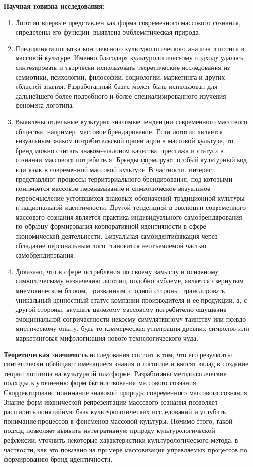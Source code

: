 \textbf{Научная новизна исследования:}
\begin{enumerate}
\item Логотип впервые представлен как форма современного массового сознания, определены его функции, выявлена эмблематическая природа.
\item Предпринята попытка комплексного культурологического анализа логотипа в массовой культуре. Именно благодаря культурологическому подходу удалось синтезировать и творчески использовать теоретические исследования из семиотики, психологии, философии, социологии, маркетинга и других областей знания. Разработанный базис может быть использован для дальнейшего более подробного и более специализированного изучения феномена логотипа.
\item Выявлены отдельные культурно значимые тенденции современного массового общества, например, массовое брендирование. Если логотип является визуальным знаком потребительской ориентации в массовой культуре, то бренд можно считать знаком-эталоном качества, престижа и статуса в сознании массового потребителя. Бренды формируют особый культурный код или язык в современной массовой культуре. В частности, интерес представляют процессы территориального брендирования, под которыми понимается массовое переназывание и символическое визуальное переосмысление устоявшихся знаковых обозначений традиционной культуры и национальной идентичности. Другой тенденцией в эволюции современного массового сознания является практика индивидуального самобрендирования по образцу формирования корпоративной идентичности в сфере экономической деятельности. Визуальная самоидентификация через обладание персональным лого становится неотъемлемой частью самобрендирования.
\item Доказано, что в сфере потребления по своему замыслу и основному символическому назначению логотип, подобно эмблеме, является свернутым мнемоническим блоком, призванным, с одной стороны, транслировать уникальный ценностный статус компании-производителя и ее продукции, а, с другой стороны, внушать целевому массовому потребителю ощущение эмоциональной сопричастности некоему симулятивному таинству или псевдо-мистическому опыту, будь то коммерческая утилизация древних символов или маркетинговая мифологизация нового технологического чуда.
\end{enumerate}

\textbf{Теоретическая значимость} исследования состоит в том, что его результаты синтетически обобщают имеющиеся знания о логотипе и вносят вклад в создание теории логотипа на культурной платформе. Разработаны методологические подходы к уточнению форм бытийствования массового сознания. Скорректировано понимание знаковой природы современного массового сознания. Знание форм иконической репрезентации массового сознания позволяет расширить понятийную базу культурологических исследований и углубить понимание процессов и феноменов массовой культуры. Помимо этого, такой подход позволяет выявить интегративную природу культурологической рефлексии, уточнить некоторые характеристики культурологического метода, в частности, как это показано на примере массовизации управляемых процессов по формированию бренд-идентичности.

